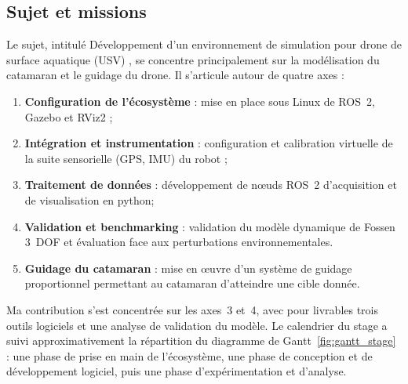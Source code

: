 \documentclass{rapportEILCO}
\begin{document}
	\subsection{Sujet et missions}
	Le sujet, intitulé \og Développement d'un environnement de simulation pour drone de surface aquatique (USV) \fg, se concentre principalement sur la modélisation du catamaran et le guidage du drone. Il s'articule autour de quatre axes :
	\begin{enumerate}
		\item \textbf{Configuration de l'écosystème} : mise en place sous Linux de ROS~2, Gazebo et RViz2 ;
		\item \textbf{Intégration et instrumentation} : configuration et calibration virtuelle de la suite sensorielle (GPS, IMU) du robot ;
		\item \textbf{Traitement de données} : développement de nœuds ROS~2 d'acquisition et de visualisation en python;
		\item \textbf{Validation et benchmarking} : validation du modèle dynamique de Fossen 3~DOF et évaluation face aux perturbations environnementales.
		\item \textbf{Guidage du catamaran} : mise en œuvre d’un système de guidage proportionnel permettant au catamaran d’atteindre une cible donnée.
	\end{enumerate}
	Ma contribution s'est concentrée sur les axes~3 et~4, avec pour livrables trois outils logiciels \cite{github} et une analyse de validation du modèle. Le calendrier du stage a suivi approximativement la répartition du diagramme de Gantt~\ref{fig:gantt_stage} : une phase de prise en main de l'écosystème, une phase de conception et de développement logiciel, puis une phase d'expérimentation et d'analyse.
	
\end{document}
